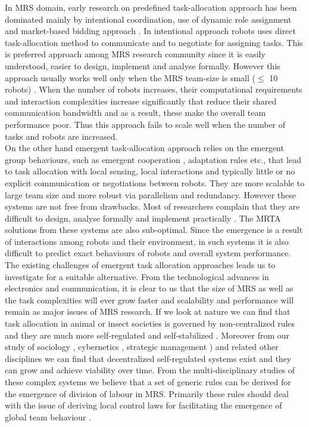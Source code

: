 \documentclass{llncs}
\begin{document}
In MRS domain, early research on predefined task-allocation approach has been dominated mainly by intentional coordination, use of dynamic role assignment \cite{Parker2008} and market-based bidding approach \cite{Dias+2006}. In intentional approach robots uses direct task-allocation method to communicate and to negotiate for assigning tasks. This is preferred approach among MRS research community since it is easily understood, easier to design, implement and analyse formally. However this approach usually works well only when the MRS team-size is small ($ \leq $ 10 robots) \cite{Lerman+2006}. When the number of robots  increases, their computational requirements and interaction complexities increase significantly that reduce their shared communication bandwidth and as a result, these make the overall team performance poor. Thus this approach fails to scale well when the number of tasks and robots are increased.\\ 
On the other hand emergent task-allocation approach relies on the emergent group behaviours, such as emergent cooperation \cite{Lerman+2006}, adaptation rules \cite{Liu+2007} etc., that lead to task allocation with local sensing, local interactions and typically little or no explicit communication or negotiations between robots. They are more scalable to large team size and more robust via parallelism and redundancy. However these systems are not free from drawbacks. Most of researchers complain that they are difficult to design, analyse formally and implement practically \cite{Gerkey+2004,Lerman+2006}. The MRTA solutions from these systems are also sub-optimal. Since the emergence is a result of interactions among robots and their environment, in such systems it is also difficult to predict exact behaviours of robots and overall system performance.\\
The existing challenges of emergent task allocation approaches leads us to investigate for a suitable alternative. From the technological advances in electronics and communication, it is clear to us that the size of MRS as well as the task complexities will ever grow faster and scalability and performance will remain as major issues of MRS research. If we look at nature we can find that task allocation in animal or insect societies is governed by non-centralized rules and they are much more self-regulated and self-stabilized \cite{Camazine+2001,Bonabeau+1999}. Moreover from our study of sociology \cite{Sayer+1992}, cybernetics \cite{Beer1981}, strategic management  \cite{Kogut2000}) and related other disciplines we can find that decentralized self-regulated systems exist and they can grow and achieve viability over time. From the multi-disciplinary studies of these complex systems we believe that a set of generic rules can be derived for the emergence of division of labour in MRS. Primarily these rules should deal with the issue of deriving local control laws for facilitating the emergence of global team behaviour \cite{Parker2008}.\\
\end{document}
